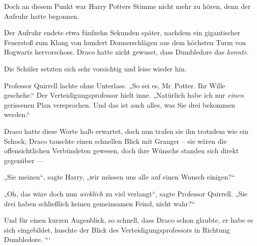 Doch an diesem Punkt war Harry Potters Stimme nicht mehr zu hören, denn der Aufruhr hatte begonnen.

\later

Der Aufruhr endete etwa fünfzehn Sekunden später, nachdem ein gigantischer Feuerstoß zum Klang von hundert Donnerschlägen aus dem höchsten Turm von Hogwarts hervorschoss. Draco hatte nicht gewusst, dass Dumbledore das \emph{konnte}.

Die Schüler setzten sich sehr vorsichtig und leise wieder hin.

Professor Quirrell lachte ohne Unterlass.
„So sei es, Mr~Potter. Ihr Wille geschehe.“ Der Verteidigungsprofessor hielt inne.
„Natürlich habe ich nur \emph{einen} gerissenen Plan versprochen. Und das ist auch alles, was Sie drei bekommen werden.“

Draco hatte diese Worte halb erwartet, doch nun trafen sie ihn trotzdem wie ein Schock; Draco tauschte einen schnellen Blick mit Granger – sie wären die offensichtlichen Verbündeten gewesen, doch ihre Wünsche standen sich direkt gegenüber —

„Sie meinen“, sagte Harry, „wir müssen uns alle auf einen Wunsch einigen?“

„Oh, das wäre doch nun \emph{wirklich} zu viel verlangt“, sagte Professor Quirrell.
„Sie drei haben schließlich keinen gemeinsamen Feind, nicht wahr?“

Und für einen kurzen Augenblick, so schnell, dass Draco schon glaubte, er habe es sich eingebildet, huschte der Blick des Verteidigungsprofessors in Richtung Dumbledore.
```

